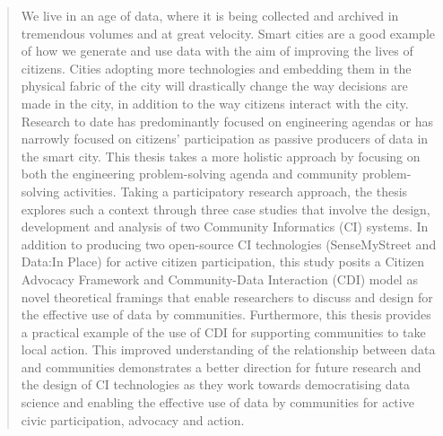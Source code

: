\begin{abstract}

We live in an age of data, where it is being collected and archived in tremendous volumes and at great velocity. Smart cities are a good example of how we generate and use data with the aim of improving the lives of citizens. Cities adopting more technologies and embedding them in the physical fabric of the city will drastically change the way decisions are made in the city, in addition to the way citizens interact with the city. Research to date has predominantly focused on engineering agendas or has narrowly focused on citizens' participation as passive producers of data in the smart city. This thesis takes a more holistic approach by focusing on both the engineering problem-solving agenda and community problem-solving activities. Taking a participatory research approach, the thesis explores such a context through three case studies that involve the design, development and analysis of two Community Informatics (CI) systems. In addition to producing two open-source CI technologies (SenseMyStreet and Data:In Place) for active citizen participation, this study posits a Citizen Advocacy Framework and Community-Data Interaction (CDI) model as novel theoretical framings that enable researchers to discuss and design for the effective use of data by communities. Furthermore, this thesis provides a practical example of the use of CDI for supporting communities to take local action. This improved understanding of the relationship between data and communities demonstrates a better direction for future research and the design of CI technologies as they work towards democratising data science and enabling the effective use of data by communities for active civic participation, advocacy and action.

\end{abstract}

